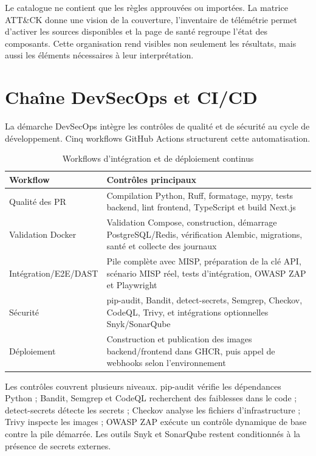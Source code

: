 Le catalogue ne contient que les règles approuvées ou importées. La matrice ATT\&CK donne une vision de la couverture, l'inventaire de télémétrie permet d'activer les sources disponibles et la page de santé regroupe l'état des composants. Cette organisation rend visibles non seulement les résultats, mais aussi les éléments nécessaires à leur interprétation.


\section{Chaîne DevSecOps et CI/CD}

La démarche DevSecOps intègre les contrôles de qualité et de sécurité au cycle de développement. Cinq workflows GitHub Actions structurent cette automatisation.

\begin{table}[htbp]
\centering
\caption{Workflows d'intégration et de déploiement continus}
\label{tab:workflows-ci}
\begin{tabular}{|p{}|p{}|}
\hline
\rowcolor[gray]{0.8}\textbf{Workflow} & \textbf{Contrôles principaux} \\
\hline
Qualité des PR & Compilation Python, Ruff, formatage, mypy, tests backend, lint frontend, TypeScript et build Next.js \\
\hline
Validation Docker & Validation Compose, construction, démarrage PostgreSQL/Redis, vérification Alembic, migrations, santé et collecte des journaux \\
\hline
Intégration/E2E/DAST & Pile complète avec MISP, préparation de la clé API, scénario MISP réel, tests d'intégration, OWASP ZAP et Playwright \\
\hline
Sécurité & pip-audit, Bandit, detect-secrets, Semgrep, Checkov, CodeQL, Trivy, et intégrations optionnelles Snyk/SonarQube \\
\hline
Déploiement & Construction et publication des images backend/frontend dans GHCR, puis appel de webhooks selon l'environnement \\
\hline
\end{tabular}
\end{table}


Les contrôles couvrent plusieurs niveaux. pip-audit vérifie les dépendances Python ; Bandit, Semgrep et CodeQL recherchent des faiblesses dans le code ; detect-secrets détecte les secrets ; Checkov analyse les fichiers d'infrastructure ; Trivy inspecte les images ; OWASP ZAP exécute un contrôle dynamique de base contre la pile démarrée. Les outils Snyk et SonarQube restent conditionnés à la présence de secrets externes.

